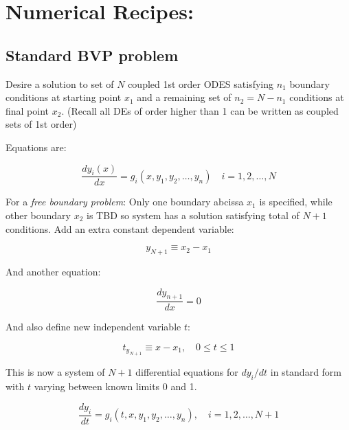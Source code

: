 \documentclass{article}
\begin{document}
    \section{Numerical Recipes:}

    \subsection{Standard BVP problem}

        Desire a solution to set of \(N\) coupled 1st order ODES satisfying
        \(n_1\) boundary conditions at starting point \(x_1\) and a remaining
        set of \(n_2=N-n_1\) conditions at final point \(x_2\). (Recall all DEs
        of order higher than 1 can be written as coupled sets of 1st order)

        Equations are:

        \begin{equation}
            \frac{dy_i(x)}{dx}=g_i(x,y_1,y_2,\dotsc ,y_n)\quad i=1,2,\dotsc ,N
        \end{equation}

        For a \textit{free boundary problem}:
        Only one boundary abcissa \(x_1\) is specified, while other boundary
        \(x_2\) is TBD so system has a solution satisfying total of \(N+1\)
        conditions. Add an extra constant dependent variable:

        \begin{equation}
            y_{N+1}\equiv x_2-x_1
        \end{equation}

        And another equation:

        \begin{equation}
            \frac{dy_{n+1}}{dx}=0
        \end{equation}

        And also define new independent variable \(t\):

        \begin{equation}
            t_{y_{N+1}}\equiv x-x_1,\quad 0\le t\le 1
        \end{equation}

        This is now a system of \(N+1\) differential equations for \(dy_i/dt\)
        in standard form with \(t\) varying between known limits 0 and 1.

        \begin{equation}
            \frac{dy_i}{dt} = g_i(t,x,y_1,y_2,\dotsc ,y_n),\quad i=1,2,\dotsc ,N+1
        \end{equation}
\end{document}
